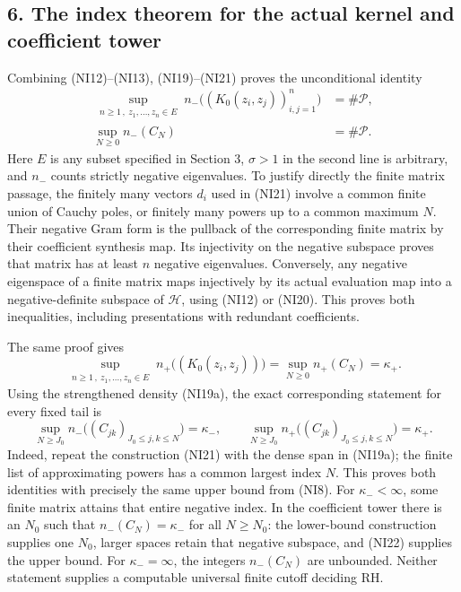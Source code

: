 \documentclass[
  10pt,
  a4paper,
]{article}
\begin{document}
\subsection{6. The index theorem for the actual kernel and coefficient
tower}\label{the-index-theorem-for-the-actual-kernel-and-coefficient-tower}

Combining (NI12)--(NI13), (NI19)--(NI21) proves the unconditional
identity \[
\boxed{
\begin{aligned}
\sup_{\substack{n\ge1\,,\ z_1,\ldots,z_n\in E}}
n_-\bigl((K_0(z_i,z_j))_{i,j=1}^n\bigr)
&=\#\mathcal P,\\
\sup_{N\ge0} n_-(C_N)&=\#\mathcal P.
\end{aligned}}
\tag{NI22}
\] Here \(E\) is any subset specified in Section 3, \(\sigma>1\) in the
second line is arbitrary, and \(n_-\) counts strictly negative
eigenvalues. To justify directly the finite matrix passage, the finitely
many vectors \(d_i\) used in (NI21) involve a common finite union of
Cauchy poles, or finitely many powers up to a common maximum \(N\).
Their negative Gram form is the pullback of the corresponding finite
matrix by their coefficient synthesis map. Its injectivity on the
negative subspace proves that matrix has at least \(n\) negative
eigenvalues. Conversely, any negative eigenspace of a finite matrix maps
injectively by its actual evaluation map into a negative-definite
subspace of \(\mathcal H\), using (NI12) or (NI20). This proves both
inequalities, including presentations with redundant coefficients.

The same proof gives \[
\sup_{\substack{n\ge1\,,\ z_1,\ldots,z_n\in E}}
n_+\bigl((K_0(z_i,z_j))\bigr)
=\sup_{N\ge0}n_+(C_N)=\kappa_+.
\tag{NI23}
\] Using the strengthened density (NI19a), the exact corresponding
statement for every fixed tail is \[
\sup_{N\ge J_0}n_-\bigl((C_{jk})_{J_0\le j,k\le N}\bigr)=\kappa_-,
\qquad
\sup_{N\ge J_0}n_+\bigl((C_{jk})_{J_0\le j,k\le N}\bigr)=\kappa_+.
\tag{NI23a}
\] Indeed, repeat the construction (NI21) with the dense span in
(NI19a); the finite list of approximating powers has a common largest
index \(N\). This proves both identities with precisely the same upper
bound from (NI8). For \(\kappa_-<\infty\), some finite matrix attains
that entire negative index. In the coefficient tower there is an \(N_0\)
such that \(n_-(C_N)=\kappa_-\) for all \(N\ge N_0\): the lower-bound
construction supplies one \(N_0\), larger spaces retain that negative
subspace, and (NI22) supplies the upper bound. For \(\kappa_-=\infty\),
the integers \(n_-(C_N)\) are unbounded. Neither statement supplies a
computable universal finite cutoff deciding RH.
\end{document}
